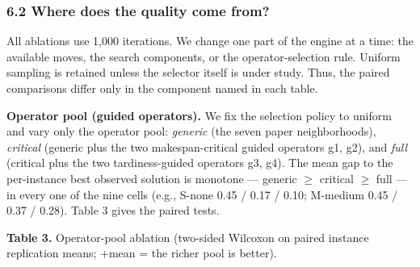 \documentclass[
]{article}
\newcounter{none} %
\begin{document}
\subsubsection{6.2 Where does the quality come
from?}\label{where-does-the-quality-come-from}

All ablations use 1,000 iterations. We change one part of the engine at
a time: the available moves, the search components, or the
operator-selection rule. Uniform sampling is retained unless the
selector itself is under study. Thus, the paired comparisons differ only
in the component named in each table.

\textbf{Operator pool (guided operators).} We fix the selection policy
to uniform and vary only the operator pool: \emph{generic} (the seven
paper neighborhoods), \emph{critical} (generic plus the two
makespan-critical guided operators g1, g2), and \emph{full} (critical
plus the two tardiness-guided operators g3, g4). The mean gap to the
per-instance best observed solution is monotone --- generic \(\ge\)
critical \(\ge\) full --- in every one of the nine cells (e.g., S-none
0.45 / 0.17 / 0.10; M-medium 0.45 / 0.37 / 0.28). Table 3 gives the
paired tests.

\textbf{Table 3.} Operator-pool ablation (two-sided Wilcoxon on paired
instance replication means; +mean = the richer pool is better).
\end{document}
